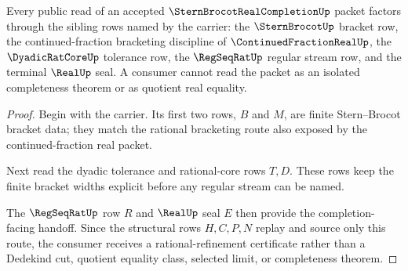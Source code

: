 \begin{theorem}
\label{thm:stern-brocot-real-completion-sibling-route}
Every public read of an accepted $\SternBrocotRealCompletionUp$ packet factors through the sibling rows named by the carrier: the $\SternBrocotUp$ bracket row, the continued-fraction bracketing discipline of $\ContinuedFractionRealUp$, the $\DyadicRatCoreUp$ tolerance row, the $\RegSeqRatUp$ regular stream row, and the terminal $\RealUp$ seal. A consumer cannot read the packet as an isolated completeness theorem or as quotient real equality.
\end{theorem}
\begin{proof}
Begin with the carrier. Its first two rows, $B$ and $M$, are finite Stern--Brocot bracket data; they match the rational bracketing route also exposed by the continued-fraction real packet.

Next read the dyadic tolerance and rational-core rows $T,D$. These rows keep the finite bracket widths explicit before any regular stream can be named.

The $\RegSeqRatUp$ row $R$ and $\RealUp$ seal $E$ then provide the completion-facing handoff. Since the structural rows $H,C,P,N$ replay and source only this route, the consumer receives a rational-refinement certificate rather than a Dedekind cut, quotient equality class, selected limit, or completeness theorem.
\end{proof}


\begin{closurestatus}{\SternBrocotRealCompletionUp}
  \theoryclosure{\seedClosure}
  \formalstatus{\unformalizedV}
\end{closurestatus}
